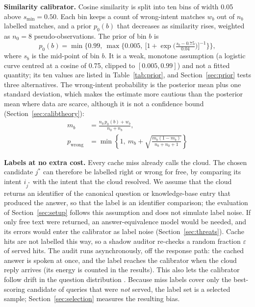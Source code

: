 \documentclass[journal]{IEEEtran}
\begin{document}
\textbf{Similarity calibrator.} Cosine similarity is split into ten bins of width 0.05 above $s_{\min}=0.50$. Each bin keeps a count of wrong-intent matches $w_b$ out of $n_b$ labelled matches, and a prior $p_0(b)$ that decreases as similarity rises, weighted as $n_0=8$ pseudo-observations. The prior of bin $b$ is
\begin{equation}
p_0(b)=\min\!\Big\{0.99,\ \max\!\Big\{0.005,\ \Big[1+\exp\!\Big(\tfrac{s_b-0.75}{0.04}\Big)\Big]^{-1}\Big\}\Big\},\tag{5a}\label{eq:prior}
\end{equation}
where $s_b$ is the mid-point of bin $b$. It is a weak, monotone assumption (a logistic curve centred at a cosine of 0.75, clipped to $[0.005,0.99]$) and not a fitted quantity; its ten values are listed in Table~\ref{tab:prior}, and Section~\ref{sec:prior} tests three alternatives. The wrong-intent probability is the posterior mean plus one standard deviation, which makes the estimate more cautious than the posterior mean where data are scarce, although it is not a confidence bound (Section~\ref{sec:calibtheory}):
\begin{align}
m_b&=\frac{n_0\,p_0(b)+w_b}{n_0+n_b},\nonumber\\
p_{\text{wrong}}&=\min\!\left\{1,\ m_b+\sqrt{\frac{m_b(1-m_b)}{n_b+n_0+1}}\right\}\label{eq:wrong}
\end{align}

\textbf{Labels at no extra cost.} Every cache miss already calls the cloud. The chosen candidate $j^{*}$ can therefore be labelled right or wrong for free, by comparing its intent $i_{j^{*}}$ with the intent that the cloud resolved. We assume that the cloud returns an identifier of the canonical question or knowledge-base entry that produced the answer, so that the label is an identifier comparison; the evaluation of Section~\ref{sec:setup} follows this assumption and does not simulate label noise. If only free text were returned, an answer-equivalence model would be needed, and its errors would enter the calibrator as label noise (Section~\ref{sec:threats}). Cache hits are not labelled this way, so a shadow auditor re-checks a random fraction $\varepsilon$ of served hits. The audit runs asynchronously, off the response path: the cached answer is spoken at once, and the label reaches the calibrator when the cloud reply arrives (its energy is counted in the results). This also lets the calibrator follow drift in the question distribution \cite{gama2014}. Because miss labels cover only the best-scoring candidate of queries that were \emph{not} served, the label set is a selected sample; Section~\ref{sec:selection} measures the resulting bias.
\end{document}
